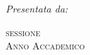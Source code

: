 \documentclass[../thesis.tex]{subfiles}
\begin{document}
\begin{titlepage}
\begin{center}
\begin{large}
                \vspace{0pt}

                \begin{flushright}
                    \textit{Presentata da:}\\
                    \vspace{1pt}
                    \myName
                \end{flushright}
            \end{large}

            \vfill

            
            \begin{normalsize}
                \textsc{sessione~\mySession}\\
                \textsc{Anno Accademico \myAY}
            \end{normalsize}

        \end{center}
    \end{titlepage}
\end{document}

